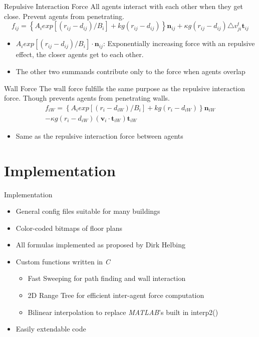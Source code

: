 \begin{frame}{Repulsive Interaction Force}
All agents interact with each other when they get close. Prevent agents from penetrating.
\begin{equation*}
f_{ij}=\left\{A_{i}exp[(r_{ij}-d_{ij})/B_{i}]+kg(r_{ij}-d_{ij})\right\}\mathbf{n}_{ij}+\kappa g(r_{ij}-d_{ij})\triangle v_{ji}^t\mathbf{t}_{ij}
\end{equation*}
\begin{itemize}
\item $A_{i}exp[(r_{ij}-d_{ij})/B_{i}]\cdot\mathbf{n}_{ij}$: Exponentially increasing force with an repulsive effect, the closer agents get to each other.
\item The other two summands contribute only to the force when agents overlap
\end{itemize}
\end{frame}

\begin{frame}{Wall Force}
The wall force fulfills the same purpose as the repulsive interaction force. Though prevents agents from penetrating walls.
\begin{multline*}
f_{iW}=\left\{A_{i}exp[(r_{i}-d_{iW})/B_{i}]+kg(r_{i}-d_{iW})\right\}\mathbf{n}_{iW}\\-\kappa g(r_{i}-d_{iW})(\mathbf{v}_{i}\cdot\mathbf{t}_{iW})\mathbf{t}_{iW}
\end{multline*}
\begin{itemize}
\item Same as the repulsive interaction force between agents
\end{itemize}
\end{frame}

\section{Implementation}

\begin{frame}{Implementation}
\begin{itemize}
 \item General config files suitable for many buildings
 \item Color-coded bitmaps of floor plans
 \item All formulas implemented as proposed by Dirk Helbing
 \item Custom functions written in \textit{C}
 \begin{itemize}
  \item Fast Sweeping for path finding and wall interaction
  \item 2D Range Tree for efficient inter-agent force computation
  \item Bilinear interpolation to replace \textit{MATLAB}'s built in interp2()
 \end{itemize}
 \item Easily extendable code
\end{itemize}
\end{frame}



